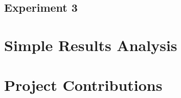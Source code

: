 \documentclass[]{article}
\begin{document}
\subsection{Experiment 3}

\section{Simple Results Analysis}

\section{Project Contributions}
\end{document}
